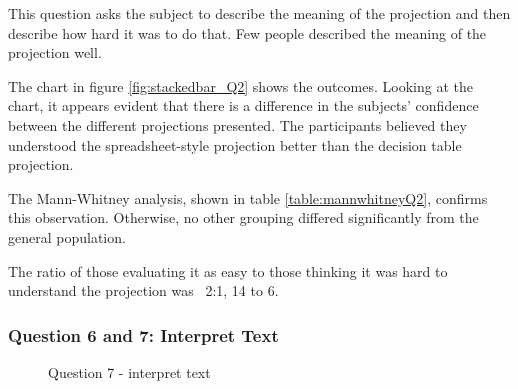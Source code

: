 This question asks the subject to describe the meaning of the projection and then describe how hard it was to do that.
Few people described the meaning of the projection well.

The chart in figure \ref{fig:stackedbar_Q2} shows the outcomes.
Looking at the chart, it appears evident that there is a difference in the subjects' confidence between the different projections presented.
The participants believed they understood the spreadsheet-style projection better than the decision table projection.

The Mann-Whitney analysis, shown in table \ref{table:mannwhitneyQ2}, confirms this observation.
Otherwise, no other grouping differed significantly from the general population.

The ratio of those evaluating it as easy to those thinking it was hard to understand the projection was ~2:1, 14 to 6.

\subsubsection{Question 6 and 7: Interpret Text}

\begin{figure}
    \centering
    \caption{Question 7 - interpret text}
    \label{fig:stackedbar_Q3}
\end{figure}

